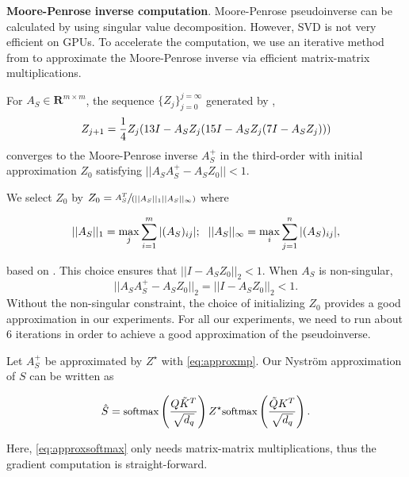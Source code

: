 \smallskip
\textbf{Moore-Penrose inverse computation}. Moore-Penrose pseudoinverse can be calculated by using singular value decomposition. However, SVD is not very efficient on GPUs. To accelerate the computation, we use an iterative method from \cite{razavi2014new} to approximate the Moore-Penrose inverse via efficient matrix-matrix multiplications.

\begin{lemma}\label{lem:pseudoinverse}
For $A_S \in \textbf{R}^{m \times m}$, the sequence $\{Z_j\}_{j = 0}^{j = \infty}$ 
generated by \cite{razavi2014new},
\begin{equation}\label{eq:approxmp}
\small
    Z_{j + 1} = \frac{1}{4}Z_j(13I - A_S Z_j(15I - A_S Z_j(7I - A_S Z_j)))
\end{equation}
converges to the Moore-Penrose inverse $A_S^{+}$ in the third-order with initial approximation $Z_0$ satisfying $||A_SA_S^+ - A_S Z_0|| < 1$.
\end{lemma}

We select $Z_0$ by $Z_0 = \sfrac{A_S^T}{(||A_S||_1||A_S||_{\infty})}$ where

\begin{align*}
\small
    ||A_S||_1 = \max_j\sum_{i = 1}^{m}|(A_S)_{ij}|; ~~
    ||A_S||_{\infty} = \max_{i}\sum_{j = 1}^{n}|(A_S)_{ij}|,
\end{align*}

based on \cite{pan1991improved}. This choice ensures that $||I - A_S Z_0||_2 < 1$. When $A_S$ is non-singular, $$||A_SA_S^+ - A_S Z_0||_2 = ||I - A_SZ_0||_2 < 1.$$ Without the non-singular constraint, the choice of initializing $Z_0$ provides a good approximation in our experiments. For all our experiments, we need to run about $6$ iterations in order to achieve a good approximation of the pseudoinverse. 

Let $A_S^{+}$ be approximated by $Z^{\star}$ with  \eqref{eq:approxmp}. Our Nystr\"{o}m approximation of $S$ can be written as

\begin{equation}\label{eq:approxsoftmax}
\small
    \hat{S} = \text{softmax}\left(\frac{Q\Tilde{K}^T}{\sqrt{d_q}}\right) Z^{\star}\text{softmax}\left(\frac{\Tilde{Q}K^T}{\sqrt{d_q}}\right).
\end{equation}

Here, \eqref{eq:approxsoftmax} only needs matrix-matrix multiplications, thus the gradient computation is straight-forward.

